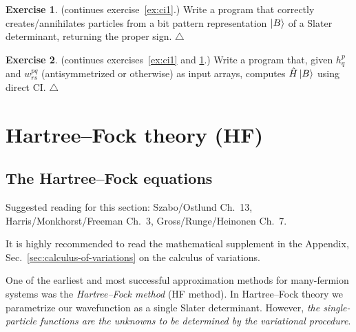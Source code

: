 \documentclass{report}
\theoremstyle{plain}
\theoremstyle{definition}
\newtheorem{exerc}{Exercise}[chapter]
\newcommand\xqed[1]{%
  \leavevmode\unskip\penalty9999 \hbox{}\nobreak\hfill
  \quad\hbox{#1}}
\newcommand\demo{\xqed{$\triangle$}}
\newenvironment{exercise}{\bigskip\begin{exerc}}{\demo\end{exerc}\bigskip}
\begin{document}
\begin{exercise}\label{ex:ci2} (continues exercise~\ref{ex:ci1}.)
  Write a program that correctly creates/annihilates particles from a
  bit pattern representation $\ket{B}$ of a Slater determinant,
  returning the proper sign.
\end{exercise}

\begin{exercise}\label{ex:ci3} (continues exercises~\ref{ex:ci1} and \ref{ex:ci2}.)
  Write a program that, given $h^{p}_q$ and $w^{pq}_{rs}$
  (antisymmetrized or otherwise) as input
  arrays, computes $\hat{H}\ket{B}$ using direct CI.
\end{exercise}



\section{Hartree--Fock theory (HF)}
\label{sec:hf}

\subsection{The Hartree--Fock equations}
\label{sef:hf-equations}


Suggested reading for this section: Szabo/Ostlund Ch.~13,
Harris/Monkhorst/Freeman Ch.~3, Gross/Runge/Heinonen Ch.~7.

It is highly recommended to read the mathematical supplement in the
Appendix, Sec.~\ref{sec:calculus-of-variations} on the calculus of
variations.

One of the earliest and most successful approximation methods for
many-fermion systems was the \emph{Hartree--Fock method} (HF method). In
Hartree--Fock theory we parametrize our wavefunction as a single Slater
determinant. However, \emph{the single-particle functions are the
  unknowns to be determined by the variational procedure}.
\end{document}
